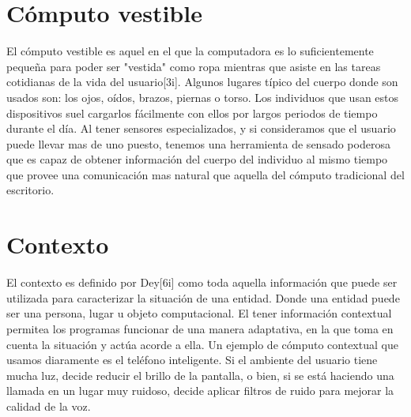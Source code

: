 \documentclass[letterpaper,12pt]{cicese}
\begin{document}
			\section{C\'omputo vestible}
				El c\'omputo vestible es aquel en el que la computadora es lo suficientemente pequeña para poder ser "vestida" como ropa mientras que asiste en las
				tareas cotidianas de la vida del usuario[3i]. Algunos lugares t\'ipico del cuerpo donde son usados son: los ojos, o\'idos, brazos, piernas o torso.
				Los individuos que usan estos dispositivos suel cargarlos f\'acilmente con ellos por largos periodos de tiempo durante el d\'ia. Al tener sensores
				especializados, y si consideramos que el usuario puede llevar mas de uno puesto, tenemos una herramienta de sensado poderosa que es capaz de obtener
				informaci\'on del cuerpo del individuo al mismo tiempo que provee una comunicaci\'on mas natural que aquella del c\'omputo tradicional del escritorio.

			\section{Contexto}
				El contexto es definido por Dey[6i] como toda aquella informaci\'on que puede ser utilizada para caracterizar la situaci\'on de una entidad. Donde una
				entidad puede ser una persona, lugar u objeto computacional. El tener informaci\'on contextual permitea  los programas funcionar de una manera adaptativa,
				en la que toma en cuenta la situaci\'on y act\'ua acorde a ella. Un ejemplo de c\'omputo contextual que usamos diaramente es el tel\'efono inteligente.
				Si el ambiente del usuario tiene mucha luz, decide reducir el brillo de la pantalla, o bien, si se est\'a haciendo una llamada en un lugar muy ruidoso,
				decide aplicar filtros de ruido para mejorar la calidad de la voz.
		
\end{document}
